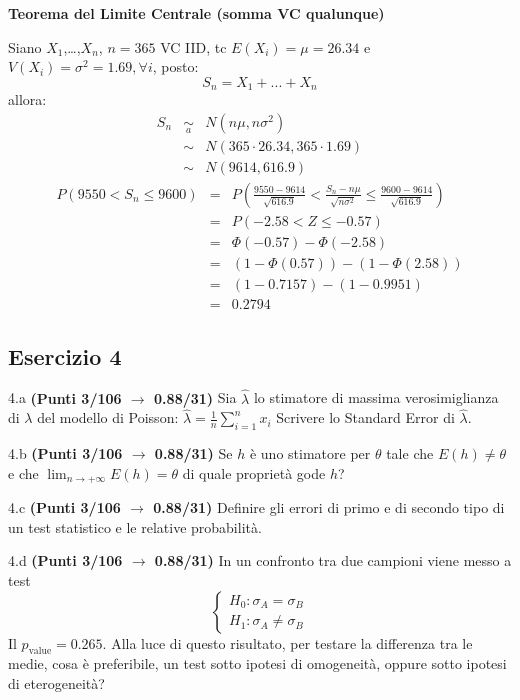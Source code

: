 \documentclass[
  11pt,
]{book}
\theoremstyle{mytheoremstyle}
\theoremstyle{mydefstyle}
\newenvironment{sol}
  {
  \begin{tcolorbox}[enhanced,breakable,arc=0.1mm,boxrule=1pt,colback=white,colframe=iblue,
  title=\bf \fontfamily{lmss}\selectfont \hspace{.5 cm} Soluzione,drop fuzzy shadow]

}{
\end{tcolorbox}
  }
\begin{document}
\begin{sol}
\textbf{Teorema del Limite Centrale (somma VC qualunque)}

Siano \(X_1\),\ldots,\(X_n\), \(n=365\) VC IID, tc \(E(X_i)=\mu=26.34\) e \(V(X_i)=\sigma^2=1.69,\forall i\), posto:
\[
      S_n = X_1 + ... + X_n
      \]
allora:\begin{eqnarray*}
  S_n & \mathop{\sim}\limits_{a}& N(n\mu,n\sigma^2) \\
     &\sim & N(365\cdot26.34,365\cdot1.69) \\
     &\sim & N(9614,616.9) 
  \end{eqnarray*}\begin{eqnarray*}
   P( 9550 < S_n \leq  9600 ) &=& P\left( \frac { 9550  -  9614 }{\sqrt{ 616.9 }} < \frac { S_n  -  n\mu }{ \sqrt{n\sigma^2} } \leq \frac { 9600  -  9614 }{\sqrt{ 616.9 }}\right)  \\
              &=& P\left(  -2.58  < Z \leq  -0.57 \right) \\
              &=& \Phi( -0.57 )-\Phi( -2.58 )\\
              &=&  (1-\Phi( 0.57 ))-(1-\Phi( 2.58 )) \\ &=& (1- 0.7157 )-(1- 0.9951 ) \\ 
              &=&  0.2794 
   \end{eqnarray*}

\end{sol}

\subsection{Esercizio 4}\label{esercizio-4-13}

4.a \textbf{(Punti 3/106 \(\rightarrow\) 0.88/31)} Sia \(\hat \lambda\) lo stimatore di massima verosimiglianza di \(\lambda\) del modello di Poisson: \(\hat\lambda =  \frac 1n\sum_{i=1}^nx_i\)
Scrivere lo Standard Error di \(\hat \lambda\).

4.b \textbf{(Punti 3/106 \(\rightarrow\) 0.88/31)} Se \(h\) è uno stimatore per \(\theta\) tale che
\(E(h)\ne \theta\) e che \(\lim_ {n\to +\infty}E(h)=\theta\) di quale proprietà gode \(h\)?

4.c \textbf{(Punti 3/106 \(\rightarrow\) 0.88/31)} Definire gli errori di primo e di secondo tipo di un test statistico e le relative probabilità.

4.d \textbf{(Punti 3/106 \(\rightarrow\) 0.88/31)} In un confronto tra due campioni viene messo a test
\[
\begin{cases}
H_0:\sigma_A=\sigma_B\\
H_1:\sigma_A\ne \sigma_B
\end{cases}
\]
Il \(p_\text{value}=0.265\). Alla luce di questo risultato, per testare la differenza tra le medie, cosa è preferibile, un test sotto ipotesi di omogeneità, oppure sotto ipotesi di eterogeneità?
\end{document}
